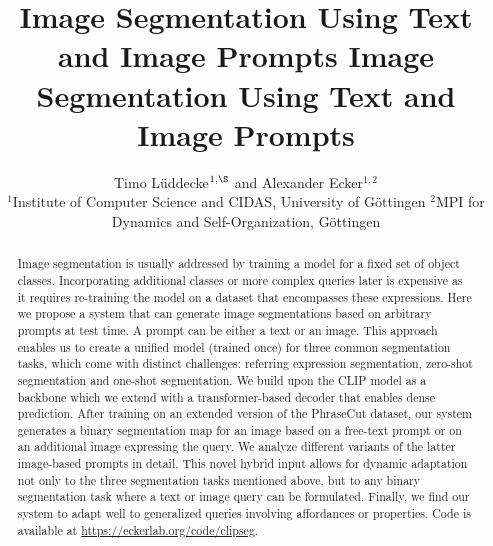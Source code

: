 \title{Image Segmentation Using Text and Image Prompts}



\title{
Image Segmentation Using Text and Image Prompts
}

\date{}

\author{
Timo Lüddecke$^{1,\S}$ and Alexander Ecker$^{1,2}$ \\
\small $^1$Institute of Computer Science and CIDAS, University of Göttingen \hspace{1cm}
\small$^2$MPI for Dynamics and Self-Organization, Göttingen
}

\maketitle


\def\todo#1{{ \color{blue}{TODO: #1} } }
\def\new{{ \color{red}{new} } }
\def\remark#1{{ \color{cyan}{#1} } }
\def\question#1{{ \color{orange}{Q: #1} } }

\def\conf#1{}

\newcommand{\x}{\mathbf{x}}
\newcommand{\y}{\mathbf{y}}
\newcommand{\xv}{\mathbf{x}}
\newcommand{\yv}{\mathbf{y}}
\newcommand{\tv}{\mathbf{t}}
\newcommand{\cv}{\mathbf{c}}
\newcommand{\pred}{\mathbf{p}}
\newcommand{\gt}{\mathbf{g}}
\newcommand{\miou}{\text{mIoU}}
\newcommand{\ioufg}{\text{IoU}_{\text{FG}}}
\newcommand{\ioubin}{\text{IoU}_{\text{BIN}}}

\begin{abstract}

Image segmentation is usually addressed by training a model for a fixed set of object classes. Incorporating additional classes or more complex queries later is expensive as it requires re-training the model on a dataset that encompasses these expressions.
Here we propose a system that can generate image segmentations based on arbitrary prompts at test time.
A prompt can be either a text or an image. This approach enables us to create a unified model (trained once) for three common segmentation tasks, which come with distinct challenges: referring expression segmentation, zero-shot segmentation and one-shot segmentation.
We build upon the CLIP model as a backbone which we extend with a transformer-based decoder that enables dense prediction. After training on an extended version of the PhraseCut dataset, our system generates a binary segmentation map for an image based on a free-text prompt or on an additional image expressing the query. 
We analyze different variants of the latter image-based prompts in detail.
This novel hybrid input allows for dynamic adaptation not only to the three segmentation tasks mentioned above, but to any binary segmentation task where a text or image query can be formulated.
Finally, we find our system to adapt well to generalized queries involving affordances or properties.
Code is available at \url{https://eckerlab.org/code/clipseg}.

\end{abstract}

